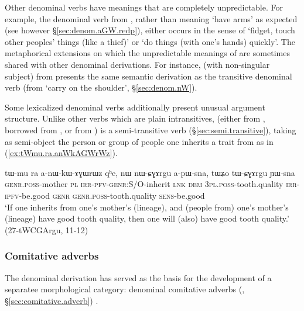 Other denominal verbs have meanings that are completely unpredictable. For example, the denominal verb  from , rather than meaning `have arms' as expected (see however §\ref{sec:denom.aGW.redp}), either occurs in the sense of `fidget, touch other peoples' things (like a thief)' or `do things (with one's hands) quickly'. The metaphorical extensions on which the unpredictable meanings of  are sometimes shared with other denominal derivations. For instance,  (with non-singular subject) from  presents the same semantic derivation as the transitive denominal verb  (from `carry on the shoulder', §\ref{sec:denom.nW}).

Some lexicalized  denominal verbs additionally present unusual argument structure. Unlike other  verbs which are plain intransitives,  (either from , borrowed from , or from ) is a semi-transitive verb (§\ref{sec:semi.transitive}), taking as semi-object the person or group of people one inherits a trait from as in (\ref{ex:tWmu.ra.anWkAGWrWz}).

\begin{exe}
\ex \label{ex:tWmu.ra.anWkAGWrWz}
\gll tɯ-mu ra a-nɯ-kɯ-ɤɣɯrɯz qʰe, nɯ nɯ-ɕɣɤrgu a-pɯ-sna, tɯʑo tɯ-ɕɣɤrgu ɲɯ-sna \\
\textsc{genr}.\textsc{poss}-mother \textsc{pl} \textsc{irr}-\textsc{pfv}-\textsc{genr}:S/O-inherit \textsc{lnk} \textsc{dem} \textsc{3pl}.\textsc{poss}-tooth.quality \textsc{irr}-\textsc{ipfv}-be.good \textsc{genr} \textsc{genr}.\textsc{poss}-tooth.quality \textsc{sens}-be.good \\
\glt `If one inherits from one's mother's (lineage), and (people from) one's mother's (lineage) have good tooth quality, then one will (also) have good tooth quality.' (27-tWCGArgu, 11-12)
\end{exe}


 \subsubsection{Comitative adverbs}  \label{sec:denom.aGW.comitative}
The  denominal derivation has served as the basis for the development of a separatee morphological category: denominal comitative adverbs (\citealt{jacques17comitative}, §\ref{sec:comitative.adverb}) .

